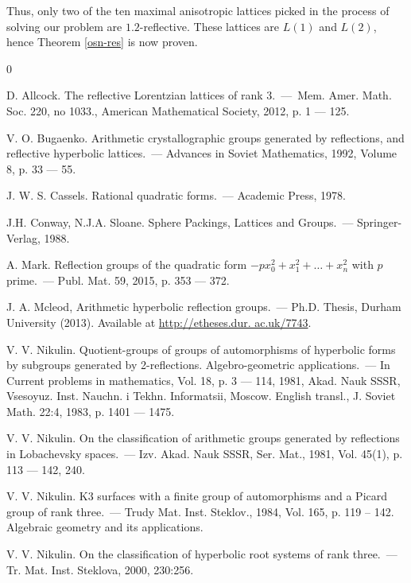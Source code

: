\documentclass[14pt]{article}
\begin{document}
Thus, only two of the ten maximal anisotropic lattices picked
in the process of solving our problem are $1.2$-reflective. These lattices are
$L(1)$ and $L(2)$, hence Theorem \ref{osn-res} is now proven.

\newpage

\begin{thebibliography}{0}

D. Allcock.  The reflective Lorentzian lattices of rank $3$.~---~Mem.
Amer. Math. Soc. 220, no 1033., American Mathematical Society, 2012,
p. 1 --- 125.

V. O. Bugaenko. Arithmetic crystallographic groups generated
by reflections, and reflective hyperbolic
lattices.~--- Advances in Soviet Mathematics, 1992, Volume 8, p. 33 --- 55.

J. W. S. Cassels. Rational quadratic forms.~--- Academic Press, 1978.

J.H. Conway, N.J.A. Sloane. Sphere Packings, Lattices and Groups.~--- Springer-Verlag, 1988.


A. Mark. Reflection groups of the quadratic form $- p x_0^2
+ x_1^2 + \ldots + x_n^2$ with $p$ prime.~--- Publ. Mat. 59, 2015, p. 353 --- 372.

J. A. Mcleod, Arithmetic hyperbolic reflection groups.~---
Ph.D. Thesis, Durham University (2013). Available at
\url{http://etheses.dur. ac.uk/7743}.

V. V. Nikulin. Quotient-groups of groups of automorphisms of hyperbolic forms by subgroups
generated by 2-reflections. Algebro-geometric applications.~--- In Current problems in
mathematics, Vol. 18, p. 3 --- 114, 1981, Akad. Nauk SSSR, Vsesoyuz. Inst. Nauchn. i Tekhn.
Informatsii, Moscow. English transl., J. Soviet Math. 22:4, 1983, p. 1401 --- 1475.

V. V. Nikulin. On the classification of arithmetic groups generated by reflections in Lobachevsky
spaces.~--- Izv. Akad. Nauk SSSR, Ser. Mat., 1981, Vol. 45(1), p. 113 --- 142, 240.

V. V. Nikulin. K3 surfaces with a finite group of automorphisms and a Picard group of rank
three.~--- Trudy Mat. Inst. Steklov., 1984, Vol. 165, p. 119 -- 142. Algebraic geometry
and its applications.

V. V. Nikulin. On the classification of hyperbolic root systems of rank three.~--- Tr. Mat. Inst.
Steklova, 2000, 230:256.


\end{thebibliography}
\end{document}
